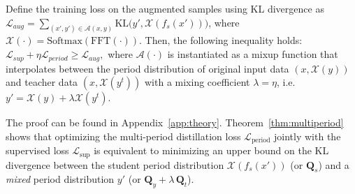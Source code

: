\begin{theorem} \label{thm:multiperiod}
Define the training loss on the augmented samples using KL divergence as $\mathcal{L}_{aug} = \sum_{(x',y') \in \mathcal{A}(x,y)} \text{KL}\big(y', \mathcal{X}(f_s(x'))\big)$, where $\mathcal{X}(\cdot) = \text{Softmax}(\text{FFT}(\cdot))$. Then, the following inequality holds: 
$
   \mathcal{L}_{sup} + \eta\mathcal{L}_{period} \geq \mathcal{L}_{aug},
$
where $\mathcal{A}(\cdot)$ is instantiated as a mixup function that interpolates between the period distribution of original input data $(x,\mathcal{X}(y))$ and teacher data $(x,\mathcal{X}(y^t))$ with a mixing coefficient $\lambda=\eta$, i.e. $y' =  \mathcal{X}(y) + \lambda \mathcal{X}(y^t)$.
\end{theorem}
The proof can be found in Appendix~\ref{app:theory}. Theorem~\ref{thm:multiperiod} shows that optimizing the multi-period distillation loss \(\mathcal{L}_{\text{period}}\) jointly with the supervised loss \(\mathcal{L}_{\text{sup}}\) is equivalent to minimizing an upper bound on the KL divergence between the student period distribution \(\mathcal{X}(f_s(x'))\) (or \(\mathbf{Q}_s\)) and a \emph{mixed} period distribution \(y'\) (or \(\mathbf{Q}_y + \lambda\,\mathbf{Q}_t\)). 


